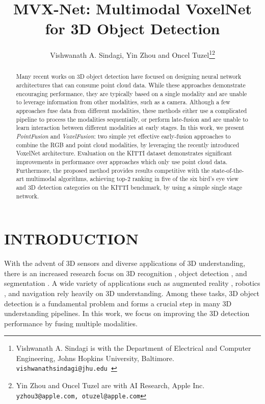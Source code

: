 \documentclass[letterpaper, 10 pt, conference]{ieeeconf}
\title{\LARGE \bf
MVX-Net: Multimodal VoxelNet for 3D Object Detection
}
\author{Vishwanath A. Sindagi, Yin Zhou and Oncel Tuzel\thanks{Vishwanath A. Sindagi is with the  Department of Electrical and Computer Engineering, Johns Hopkins University, Baltimore.
        {\tt\small vishwanathsindagi@jhu.edu }}\thanks{Yin Zhou and Oncel Tuzel are with AI Research, Apple Inc.
        {\tt\small yzhou3@apple.com, otuzel@apple.com}}}
\begin{document}
\maketitle
\thispagestyle{empty}
\pagestyle{empty}


\begin{abstract}

Many recent works on 3D object detection have focused on designing neural network architectures that can consume point cloud data. While these approaches demonstrate encouraging performance, they are typically based on a single modality and are unable to leverage information from other modalities, such as a camera. Although a few approaches fuse data from different modalities, these methods either use a complicated pipeline to process the modalities sequentially, or perform late-fusion and are unable to learn interaction between different modalities at early stages. In this work, we present \textit{PointFusion} and \textit{VoxelFusion}: two simple yet effective early-fusion approaches to combine the RGB and point cloud modalities, by leveraging the recently introduced VoxelNet architecture. 
Evaluation on the KITTI dataset demonstrates significant improvements in performance over approaches which only use point cloud data. Furthermore, the proposed method provides results competitive with the state-of-the-art multimodal algorithms, achieving top-2 ranking in five of the six bird’s eye view and 3D detection categories on the KITTI benchmark, by using a simple single stage network.




\end{abstract}


\section{INTRODUCTION}


With the advent of 3D sensors and diverse applications of 3D understanding, there is an increased research focus on 3D recognition \cite{xiang2016objectnet3d}, object detection \cite{REF:zhou2017voxelnet,REF:qi2017frustum}, and segmentation \cite{REF:qi2017pointnet}. A wide variety of applications such as augmented reality \cite{REF:AR}, robotics \cite{REF:Housekeeping}, and navigation \cite{REF:Geiger2012CVPR,REF:Drone} rely heavily on 3D understanding. Among these tasks, 3D object detection is a fundamental problem and forms a crucial step in many 3D understanding pipelines. In this work, we focus on improving the 3D detection performance by fusing multiple modalities. 
\end{document}
